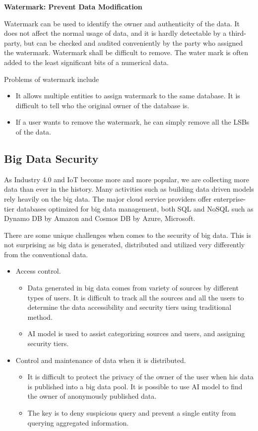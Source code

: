 \vspace{0.1in}
\noindent \textbf{Watermark: Prevent Data Modification}
\vspace{0.1in}

Watermark can be used to identify the owner and authenticity of the data. It does not affect the normal usage of data, and it is hardly detectable by a third-party, but can be checked and audited conveniently by the party who assigned the watermark. Watermark shall be difficult to remove. The water mark is often added to the least significant bits of a numerical data.

Problems of watermark include
\begin{itemize}
	\item It allows multiple entities to assign watermark to the same database. It is difficult to tell who the original owner of the database is.
	\item If a user wants to remove the watermark, he can simply remove all the LSBs of the data.
\end{itemize}

\subsection{Big Data Security}

As Industry 4.0 and IoT become more and more popular, we are collecting more data than ever in the history. Many activities such as building data driven models rely heavily on the big data. The major cloud service providers offer enterprise-tier databases optimized for big data management, both SQL and NoSQL such as Dynamo DB by Amazon and Cosmos DB by Azure, Microsoft.

There are some unique challenges when comes to the security of big data. This is not surprising as big data is generated, distributed and utilized very differently from the conventional data.
\begin{itemize}
	\item Access control. 
	\begin{itemize}
		\item Data generated in big data comes from variety of sources by different types of users. It is difficult to track all the sources and all the users to determine the data accessibility and security tiers using traditional method.
		\item AI model is used to assist categorizing sources and users, and assigning security tiers.
	\end{itemize}
	\item Control and maintenance of data when it is distributed.
	\begin{itemize}
		\item It is difficult to protect the privacy of the owner of the user when his data is published into a big data pool. It is possible to use AI model to find the owner of anonymously published data.
		\item The key is to deny suspicious query and prevent a single entity from querying aggregated information.
	\end{itemize}
\end{itemize}

